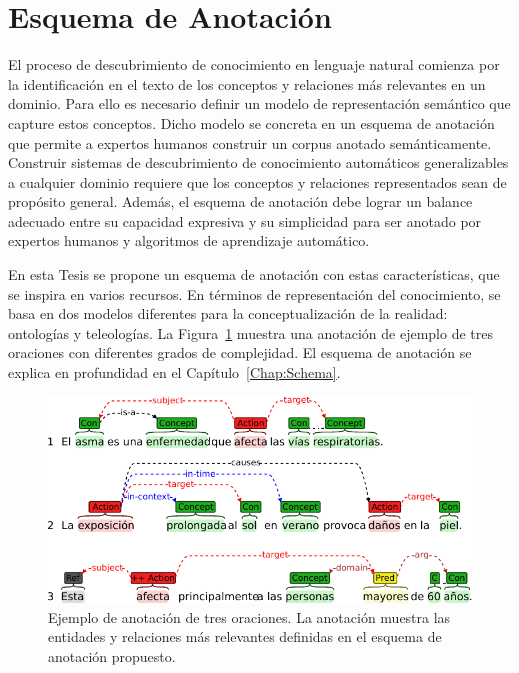 \section{Esquema de Anotación}\label{results:schema}

El proceso de descubrimiento de conocimiento en lenguaje natural comienza por la identificación en el texto de los conceptos y relaciones más relevantes en un dominio. Para ello es necesario definir un modelo de representación semántico que capture estos conceptos. Dicho modelo se concreta en un esquema de anotación que permite a expertos humanos construir un corpus anotado semánticamente. Construir sistemas de descubrimiento de conocimiento automáticos generalizables a cualquier dominio requiere que los conceptos y relaciones representados sean de propósito general. Además, el esquema de anotación debe lograr un balance adecuado entre su capacidad expresiva y su simplicidad para ser anotado por expertos humanos y algoritmos de aprendizaje automático.

En esta Tesis se propone un esquema de anotación con estas características, que se inspira en varios recursos.
En términos de representación del conocimiento, se basa en dos modelos diferentes para la conceptualización de la realidad: ontologías y teleologías.
La Figura~\ref{fig:example} muestra una anotación de ejemplo de tres oraciones con diferentes grados de complejidad.
El esquema de anotación se explica en profundidad en el Capítulo~\ref{Chap:Schema}.

\begin{figure}[htb]
    \includegraphics[width=\textwidth]{Images/Chapters/ExampleSentences.pdf}
    \caption[Ejemplos de anotación.]{Ejemplo de anotación de tres oraciones. La anotación muestra las entidades y relaciones más relevantes definidas en el esquema de anotación propuesto.}
    \label{fig:example}
\end{figure}

